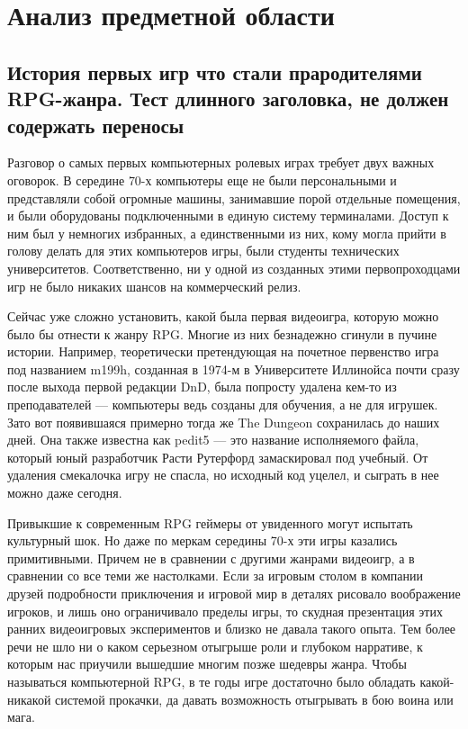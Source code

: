 \section{Анализ предметной области}
\subsection{История первых игр что стали прародителями RPG-жанра. Тест длинного заголовка, не должен содержать переносы}

Разговор о самых первых компьютерных ролевых играх требует двух важных оговорок. В середине 70-х компьютеры еще не были персональными и представляли собой огромные машины, занимавшие порой отдельные помещения, и были оборудованы подключенными в единую систему терминалами. Доступ к ним был у немногих избранных, а единственными из них, кому могла прийти в голову делать для этих компьютеров игры, были студенты технических университетов. Соответственно, ни у одной из созданных этими первопроходцами игр не было никаких шансов на коммерческий релиз. 

Сейчас уже сложно установить, какой была первая видеоигра, которую можно было бы отнести к жанру RPG. Многие из них безнадежно сгинули в пучине истории. Например, теоретически претендующая на почетное первенство игра под названием m199h,  созданная в 1974-м в Университете Иллинойса почти сразу после выхода первой редакции DnD, была попросту удалена кем-то из преподавателей — компьютеры ведь созданы для обучения, а не для игрушек. Зато вот появившаяся примерно тогда же The Dungeon сохранилась до наших дней. Она также известна как pedit5 — это название исполняемого файла, который юный разработчик Расти Рутерфорд замаскировал под учебный. От удаления смекалочка игру не спасла, но исходный код уцелел, и сыграть в нее можно даже сегодня.

Привыкшие к современным RPG геймеры от увиденного могут испытать культурный шок. Но даже по меркам середины 70-х эти игры казались примитивными. Причем не в сравнении с другими жанрами видеоигр, а в сравнении со все теми же настолками. Если за игровым столом в компании друзей подробности приключения и игровой мир в деталях рисовало воображение игроков, и лишь оно ограничивало пределы игры, то скудная презентация этих ранних видеоигровых экспериментов и близко не давала такого опыта. Тем более речи не шло ни о каком серьезном отыгрыше роли и глубоком нарративе, к которым нас приучили вышедшие многим позже шедевры жанра. Чтобы называться компьютерной RPG, в те годы игре достаточно было обладать какой-никакой системой прокачки, да давать возможность отыгрывать в бою воина или мага.

